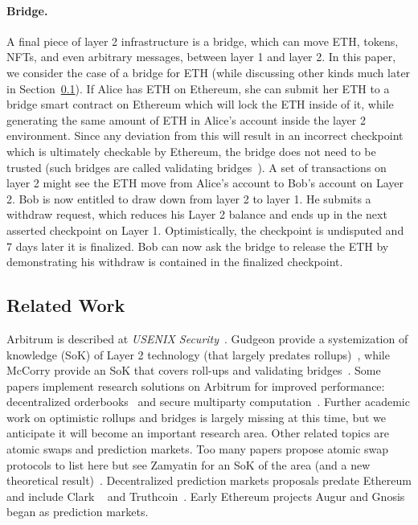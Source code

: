 \paragraph{Bridge.} A final piece of layer 2 infrastructure is a bridge, which can move ETH, tokens, NFTs, and even arbitrary messages, between layer 1 and layer 2. In this paper, we consider the case of a bridge for ETH (while discussing other kinds much later in Section~\ref{}). If Alice has ETH on Ethereum, she can submit her ETH to a bridge smart contract on Ethereum which will lock the ETH inside of it, while generating the same amount of ETH in Alice's account inside the layer 2 environment. Since any deviation from this will result in  an incorrect checkpoint which is ultimately checkable by Ethereum, the bridge does not need to be trusted (such bridges are called validating bridges~\cite{}). A set of transactions on layer 2 might see the ETH move from Alice's account to Bob's account on Layer 2. Bob is now entitled to draw down from layer 2 to layer 1. He submits a withdraw request, which reduces his Layer 2 balance and ends up in the next asserted checkpoint on Layer 1. Optimistically, the checkpoint is undisputed and 7 days later it is finalized. Bob can now ask the bridge to release the ETH by demonstrating his withdraw is contained in the finalized checkpoint.

\subsection{Related Work} 

Arbitrum is described at \textit{USENIX Security}~\cite{}. Gudgeon \etal provide a systemization of knowledge (SoK) of Layer 2 technology (that largely predates rollups)~\cite{}, while McCorry \etal provide an SoK that covers roll-ups and validating bridges~\cite{}. Some papers implement research solutions on Arbitrum for improved performance:  decentralized orderbooks~\cite{} and secure multiparty computation~\cite{}. Further academic work on optimistic rollups and bridges is largely missing at this time, but we anticipate it will become an important research area.  Other related topics are atomic swaps and prediction markets. Too many papers propose atomic swap protocols to list here but see Zamyatin \etal for an SoK of the area (and a new theoretical result)~\cite{}. Decentralized prediction markets proposals predate Ethereum and include Clark \etal~\cite{} and Truthcoin~\cite{}. Early Ethereum projects Augur and Gnosis began as prediction markets. 

